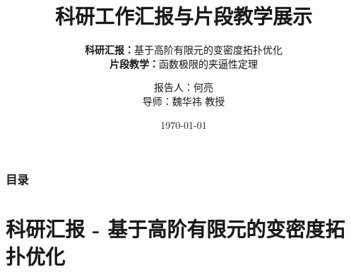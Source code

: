 \documentclass[notheorems]{beamer}
\begin{document}
	
	\title[科研汇报与片段教学]{科研工作汇报与片段教学展示}
	\subtitle{%
		\vspace{4pt}
		{\small\textbf{科研汇报：}基于高阶有限元的变密度拓扑优化} \\[6pt]
		{\small\textbf{片段教学：}函数极限的夹逼性定理}
	}
	
	\author[何亮]{报告人：何亮 \\
		\vspace{5pt}
		导师：{魏华祎} 教授}
	
	\date{\today}
	
	\frame[plain]{\titlepage}
	
	
	\begin{frame}
		\frametitle{目录}
		\tableofcontents
	\end{frame}
	
	
	\section{科研汇报 - 基于高阶有限元的变密度拓扑优化}
	
\end{document}
